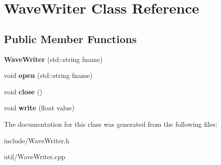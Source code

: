 \hypertarget{classWaveWriter}{\section{Wave\-Writer Class Reference}
\label{classWaveWriter}
}
\subsection*{Public Member Functions}
\begin{DoxyCompactItemize}
\item 
\hypertarget{classWaveWriter_ab56ef6702c7c651004329fe76893b2f7}{{\bfseries Wave\-Writer} (std\-::string fname)}\label{classWaveWriter_ab56ef6702c7c651004329fe76893b2f7}

\item 
\hypertarget{classWaveWriter_a369569d5d2068f497731936073ad4ad1}{void {\bfseries open} (std\-::string fname)}\label{classWaveWriter_a369569d5d2068f497731936073ad4ad1}

\item 
\hypertarget{classWaveWriter_ae50259472af637a4083399953440ee0e}{void {\bfseries close} ()}\label{classWaveWriter_ae50259472af637a4083399953440ee0e}

\item 
\hypertarget{classWaveWriter_a267d0704f57004f0adf079096d3dc460}{void {\bfseries write} (float value)}\label{classWaveWriter_a267d0704f57004f0adf079096d3dc460}

\end{DoxyCompactItemize}


The documentation for this class was generated from the following files\-:\begin{DoxyCompactItemize}
\item 
include/Wave\-Writer.\-h\item 
util/Wave\-Writer.\-cpp\end{DoxyCompactItemize}
